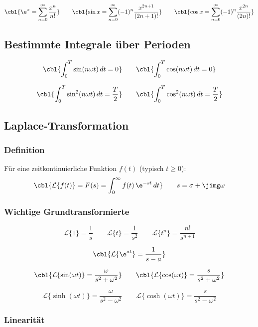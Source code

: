 \[
\cbl{\e^{x} = \sum_{n=0}^{\infty} \frac{x^n}{n!}}
\qquad
\cbl{\sin x = \sum_{n=0}^{\infty} (-1)^n \frac{x^{2n+1}}{(2n+1)!}}
\qquad
\cbl{\cos x = \sum_{n=0}^{\infty} (-1)^n \frac{x^{2n}}{(2n)!}}
\]

\subsection{Bestimmte Integrale über Perioden}

\[
\cbl{\int_0^T \sin(n \omega t)\,dt = 0}
\qquad
\cbl{\int_0^T \cos(n \omega t)\,dt = 0}
\]

\[
\cbl{\int_0^T \sin^2(n \omega t)\,dt = \frac{T}{2}}
\qquad
\cbl{\int_0^T \cos^2(n \omega t)\,dt = \frac{T}{2}}
\]

\subsection{Laplace-Transformation}

\subsubsection{Definition}

Für eine zeitkontinuierliche Funktion $f(t)$ (typisch $t\ge 0$):
\[
\cbl{\mathcal{L}\{f(t)\} = F(s) = \int_{0}^{\infty} f(t)\, \e^{-st}\,dt}
\qquad
s = \sigma + \jimg \omega
\]

\subsubsection{Wichtige Grundtransformierte}

\[
\mathcal{L}\{1\} = \frac{1}{s}
\qquad
\mathcal{L}\{t\} = \frac{1}{s^2}
\qquad
\mathcal{L}\{t^n\} = \frac{n!}{s^{n+1}}
\]

\[
\cbl{\mathcal{L}\{\e^{at}\} = \frac{1}{s-a}}
\]

\[
\cbl{\mathcal{L}\{\sin(\omega t)\} = \frac{\omega}{s^2+\omega^2}}
\qquad
\cbl{\mathcal{L}\{\cos(\omega t)\} = \frac{s}{s^2+\omega^2}}
\]

\[
\mathcal{L}\{\sinh(\omega t)\} = \frac{\omega}{s^2-\omega^2}
\qquad
\mathcal{L}\{\cosh(\omega t)\} = \frac{s}{s^2-\omega^2}
\]

\subsubsection{Linearität}


